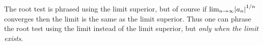 \begin{note}
The root test is phrased using the limit superior, but of course if \(\lim_{n \to \infty} \abs*{a_n}^{1 / n}\) converges then the limit is the same as the limit superior.
Thus one can phrase the root test using the limit instead of the limit superior, but \emph{only when the limit exists}.
\end{note}
